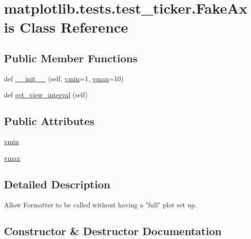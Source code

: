 \hypertarget{classmatplotlib_1_1tests_1_1test__ticker_1_1FakeAxis}{}\section{matplotlib.\+tests.\+test\+\_\+ticker.\+Fake\+Axis Class Reference}
\label{classmatplotlib_1_1tests_1_1test__ticker_1_1FakeAxis}
\subsection*{Public Member Functions}
\begin{DoxyCompactItemize}
\item 
def \hyperlink{classmatplotlib_1_1tests_1_1test__ticker_1_1FakeAxis_a323d15e193df99689986f827dd3de18c}{\+\_\+\+\_\+init\+\_\+\+\_\+} (self, \hyperlink{classmatplotlib_1_1tests_1_1test__ticker_1_1FakeAxis_ab53392e5033382880fd199c0ca1355ff}{vmin}=1, \hyperlink{classmatplotlib_1_1tests_1_1test__ticker_1_1FakeAxis_a6683b1169f1654792a570eb87bca4215}{vmax}=10)
\item 
def \hyperlink{classmatplotlib_1_1tests_1_1test__ticker_1_1FakeAxis_a2bf0839b3ad000f33ac1ea34cc3a220e}{get\+\_\+view\+\_\+interval} (self)
\end{DoxyCompactItemize}
\subsection*{Public Attributes}
\begin{DoxyCompactItemize}
\item 
\hyperlink{classmatplotlib_1_1tests_1_1test__ticker_1_1FakeAxis_ab53392e5033382880fd199c0ca1355ff}{vmin}
\item 
\hyperlink{classmatplotlib_1_1tests_1_1test__ticker_1_1FakeAxis_a6683b1169f1654792a570eb87bca4215}{vmax}
\end{DoxyCompactItemize}


\subsection{Detailed Description}
\begin{DoxyVerb}Allow Formatter to be called without having a "full" plot set up.\end{DoxyVerb}
 

\subsection{Constructor \& Destructor Documentation}
\mbox{\label{classmatplotlib_1_1tests_1_1test__ticker_1_1FakeAxis_a323d15e193df99689986f827dd3de18c}} 
